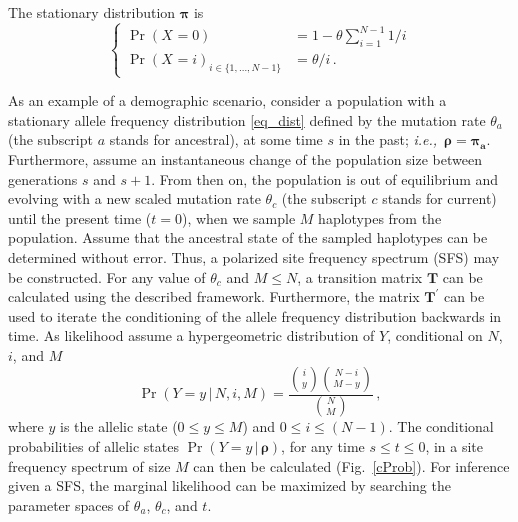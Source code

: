 \documentclass[preprint]{elsarticle}
\newcommand{\bs}[1]{\ensuremath{\boldsymbol{#1}}}
\newcommand\given{{\,|\,}}
\newcommand\ie{{\it i.e.,}}
\newcommand\x[1]{\ensuremath{X_{#1}}}
\newcommand\y{\ensuremath{Y}}
\begin{document}
The stationary distribution $\bs{\pi}$ is 
\begin{equation}\label{eq_dist}
\begin{cases}
\Pr(\x{}=0)&=1-\theta\sum_{i=1}^{N-1}1/i\\
\Pr(\x{}=i)_{i \in \{1, \ldots, N-1\}} &=\theta/i\,.
\end{cases}
\end{equation}

As an example of a demographic scenario, consider a population with a stationary allele frequency distribution \eqref{eq_dist} defined by the mutation rate $\theta_a$ (the subscript $a$ stands for ancestral), at some time $s$ in the past; \ie\ $\bs{\rho} = \bs{\pi_a}$. Furthermore, assume an instantaneous change of the population size between generations $s$ and $s+1$. From then on, the population is out of equilibrium and evolving with a new scaled mutation rate $\theta_c$ (the subscript $c$ stands for current) until the present time ($t=0$), when we sample $M$ haplotypes from the population. Assume that the ancestral state of the sampled haplotypes can be determined without error. Thus, a polarized site frequency spectrum (SFS) may be constructed. For any value of $\theta_c$ and $M \leq N$, a transition matrix $\mathbf{T}$ can be calculated using the described framework. Furthermore, the matrix $\mathbf{T}^{'}$ can be used to iterate the conditioning of the allele frequency distribution backwards in time. As likelihood assume a hypergeometric distribution of $Y$, conditional on $N$, $i$, and $M$
\begin{equation}\label{X0}
\Pr(\y=y\given N,i,M)=\frac{\binom{i}{y}\binom{N-i}{M-y}}{\binom{N}{M}}\,,
\end{equation}
where $y$ is the allelic state ($0\leq y\leq M$) and $0\leq i\leq (N-1)$. The conditional probabilities of allelic states $\Pr(Y = y \given \bs{\rho})$, for any time $s\leq t\leq 0$, in a site frequency spectrum of size $M$ can then be calculated (Fig.~\ref{cProb}). For inference given a SFS, the marginal likelihood can be maximized by searching the parameter spaces of $\theta_a$, $\theta_c$, and $t$.
\end{document}
